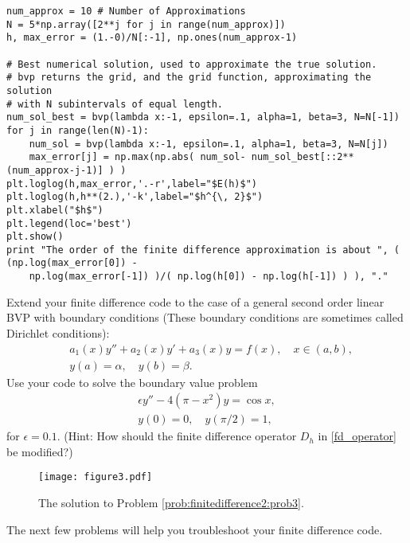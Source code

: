 \begin{lstlisting}
num_approx = 10 # Number of Approximations
N = 5*np.array([2**j for j in range(num_approx)])
h, max_error = (1.-0)/N[:-1], np.ones(num_approx-1)

# Best numerical solution, used to approximate the true solution.
# bvp returns the grid, and the grid function, approximating the solution
# with N subintervals of equal length.
num_sol_best = bvp(lambda x:-1, epsilon=.1, alpha=1, beta=3, N=N[-1])
for j in range(len(N)-1):
    num_sol = bvp(lambda x:-1, epsilon=.1, alpha=1, beta=3, N=N[j])
    max_error[j] = np.max(np.abs( num_sol- num_sol_best[::2**(num_approx-j-1)] ) )
plt.loglog(h,max_error,'.-r',label="$E(h)$")
plt.loglog(h,h**(2.),'-k',label="$h^{\, 2}$")
plt.xlabel("$h$")
plt.legend(loc='best')
plt.show()
print "The order of the finite difference approximation is about ", ( (np.log(max_error[0]) -
    np.log(max_error[-1]) )/( np.log(h[0]) - np.log(h[-1]) ) ), "."
\end{lstlisting}


\begin{problem}
Extend your finite difference code to the case of a general second order linear BVP with boundary conditions (These boundary conditions are sometimes called Dirichlet conditions):
\begin{align*}
	&{ } a_1(x)y'' +a_2(x)y'+ a_3(x) y = f(x), \quad x \in (a,b),\\
	&{ } y(a) = \alpha, \quad y(b) = \beta.
\end{align*}
Use your code to solve the boundary value problem
\begin{align*}
	\epsilon y'' - 4(\pi - x^2)y = \cos x, \\
	y(0) = 0, \quad y(\pi/2) = 1,
\end{align*}
for $\epsilon = 0.1$.
\label{prob:finitedifference2:prob3}
(Hint: How should the finite difference operator $D_h$ in \eqref{fd_operator} be modified?)

\end{problem}



\begin{figure}[h]
\centering
\texttt{[image: figure3.pdf]}
\caption{The solution to Problem \ref{prob:finitedifference2:prob3}.
}
\end{figure}


The next few problems will help you troubleshoot your finite difference code.

